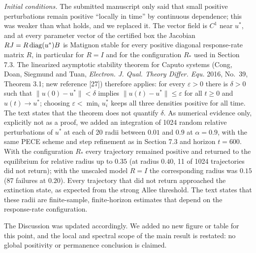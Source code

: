 {\emph{Initial conditions.} The submitted manuscript only said that small positive perturbations remain positive ``locally in time'' by continuous dependence; this was weaker than what holds, and we replaced it. The vector field is \(C^1\) near \(u^*\), and at every parameter vector of the certified box the Jacobian \(RJ=R\operatorname{diag}(u^*)B\) is Matignon stable for every positive diagonal response-rate matrix \(R\), in particular for \(R=I\) and for the configuration \(R_*\) used in Section 7.3. The linearized asymptotic stability theorem for Caputo systems (Cong, Doan, Siegmund and Tuan, \emph{Electron. J. Qual. Theory Differ. Equ.} 2016, No.~39, Theorem 3.1; new reference [27]) therefore applies: for every \(\varepsilon>0\) there is \(\delta>0\) such that \(\|u(0)-u^*\|<\delta\) implies \(\|u(t)-u^*\|\le\varepsilon\) for all \(t\ge0\) and \(u(t)\to u^*\); choosing \(\varepsilon<\min_iu_i^*\) keeps all three densities positive for all time. The text states that the theorem does not quantify \(\delta\). As numerical evidence only, explicitly not as a proof, we added an integration of 1024 random relative perturbations of \(u^*\) at each of 20 radii between \(0.01\) and \(0.9\) at \(\alpha=0.9\), with the same PECE scheme and step refinement as in Section 7.3 and horizon \(t=600\). With the configuration \(R_*\) every trajectory remained positive and returned to the equilibrium for relative radius up to \(0.35\) (at radius \(0.40\), 11 of 1024 trajectories did not return); with the unscaled model \(R=I\) the corresponding radius was \(0.15\) (87 failures at \(0.20\)). Every trajectory that did not return approached the extinction state, as expected from the strong Allee threshold. The text states that these radii are finite-sample, finite-horizon estimates that depend on the response-rate configuration.

The Discussion was updated accordingly. We added no new figure or table for this point, and the local and spectral scope of the main result is restated: no global positivity or permanence conclusion is claimed.}


